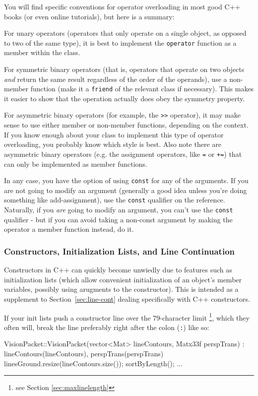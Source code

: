 \documentclass[12pt]{article}
\newcommand{\code}[1]{\texttt{#1}}
\begin{document}
You will find specific conventions for operator overloading in most good C++ books (or even online tutorials), but here is a summary:

For unary operators (operators that only operate on a single object, as opposed to two of the same type), it is best to implement the \texttt{operator} function as a member within the class.

For symmetric binary operators (that is, operators that operate on two objects \emph{and} return the same result regardless of the order of the operands), use a non-member function (make it a \texttt{friend} of the relevant class if necessary). This makes it easier to show that the operation actually does obey the symmetry property.

For asymmetric binary operators (for example, the \texttt{>{}>} operator), it may make sense to use either member or non-member functions, depending on the context. If you know enough about your class to implement this type of operator overloading, you probably know which style is best. Also note there are asymmetric binary operators (e.g. the assignment operators, like \texttt{=} or \texttt{+=}) that can only be implemented as member functions.

In any case, you have the option of using \texttt{const} for any of the arguments. If you are not going to modify an argument (generally a good idea unless you're doing something like add-assignment), use the \texttt{const} qualifier on the reference. Naturally, if you \emph{are} going to modify an argument, you can't use the \texttt{const} qualifier - but if you can avoid taking a non-const argument by making the operator a member function instead, do it.

\subsubsection{Constructors, Initialization Lists, and Line Continuation}
\label{sec:ccpp-initlists}
Constructors in C++ can quickly become unwiedly due to features such as initialization lists (which allow convenient initialization of an object's member variables, possibly using arugments to the constructor). This is intended as a supplement to Section~\ref{sec:line-cont} dealing specifically with C++ constructors.

If your init lists push a constructor line over the 79-character limit \footnote{see Section \ref{sec:maxlinelength}}, which they often will, break the line preferably right after the colon (\code{:}) like so:
\begin{codeex}
VisionPacket::VisionPacket(vector<Mat> lineContours, Matx33f perspTrans) :
              lineContours(lineContours), perspTrans(perspTrans) {
    linesGround.resize(lineContours.size());
    sortByLength();
    ...
}
\end{codeex}
\end{document}
